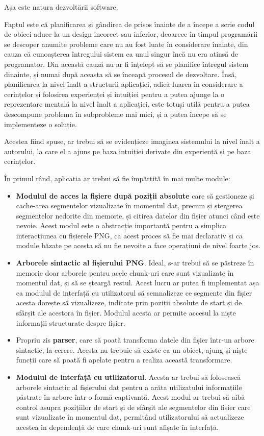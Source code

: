 \documentclass[a4paper,12pt]{report}
\begin{document}
Așa este natura dezvoltării software.

Faptul este că planificarea și gândirea de prisos înainte de a începe a scrie codul
de obicei aduce la un design incorect sau inferior, deoarece în timpul programării
se descoper anumite probleme care nu au fost luate în considerare înainte,
din cauza că cunoașterea întregului sistem ca unul singur încă nu era atinsă de programator.
Din această cauză nu ar fi înțelept să se planifice întregul sistem
dinainte, și numai după aceasta să se înceapă procesul de dezvoltare.
Însă, planificarea la nivel înalt a structurii aplicației,
adică luarea în considerare a cerințelor și folosirea experienței și intuiției pentru
a putea ajunge la o reprezentare mentală la nivel înalt a aplicației,
este totuși utilă pentru a putea descompune problema în subprobleme mai mici,
și a putea începe să se implementeze o soluție.
 
Acestea fiind spuse, ar trebui să se evidențieze imaginea sistemului la nivel înalt a autorului,
la care el a ajuns pe baza intuiției derivate din experiență și pe baza cerințelor.

În primul rând, aplicația ar trebui să fie împărțită în mai multe module:
\begin{itemize}
  \item 
  \textbf{Modulul de acces la fișiere după poziții absolute} care
  să gestioneze și cache-area segmentelor vizualizate în momentul dat,
  precum și ștergerea segmentelor nedorite din memorie,
  și citirea datelor din fișier atunci când este nevoie.
  Acest modul este o abstracție importantă pentru a simplica interacțiunea cu
  fișierele PNG, ca acest proces să fie mai declarativ și ca module băzate pe
  acesta să nu fie nevoite a face operațiuni de nivel foarte jos.

  \item
  \textbf{Arborele sintactic al fișierului PNG}.
  Ideal, s-ar trebui să se păstreze în memorie doar arborele pentru acele chunk-uri
  care sunt vizualizate în momentul dat, și să se șteargă restul.
  Acest lucru ar putea fi implementat așa ca modulul de interfață cu utilizatorul să semnalizeze
  ce segmente din fișier acesta dorește să vizualizeze, indicate prin poziții absolute 
  de start și de sfârșit ale acestora în fișier.
  Modulul acesta ar permite accesul la niște informații structurate despre fișier.

  \item
  Propriu zis \textbf{parser}, care să poată transforma
  datele din fișier într-un arbore sintactic, la cerere.
  Acesta nu trebuie să existe ca un obiect, ajung și niște funcții care să poată
  fi apelate pentru a realiza această transformare.

  \item
  \textbf{Modulul de interfață cu utilizatorul}.
  Acesta ar trebui să folosească arborele sintactic al fișierului dat pentru
  a arăta utilizatului informațiile păstrate în arbore într-o formă captivantă.
  Acest modul ar trebui să aibă control asupra pozițiilor de start și de sfârșit
  ale segmentelor din fișier care sunt vizualizate în momentul dat, 
  permitând utilizatorului să actualizeze acestea în dependență 
  de care chunk-uri sunt afișate în interfață.
\end{itemize}
\end{document}
